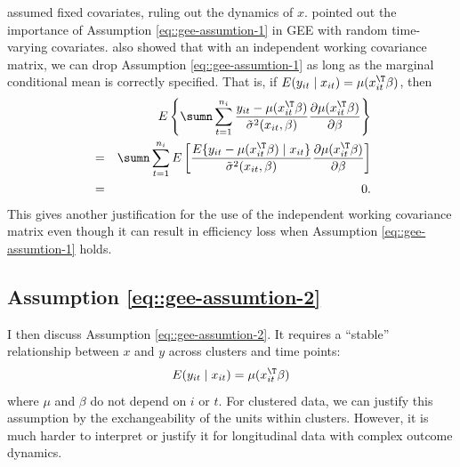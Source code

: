 \citet{liang1986longitudinal} assumed fixed covariates, ruling out the dynamics of $x$.
\citet{sullivan1994cautionary} pointed out the importance of Assumption \eqref{eq::gee-assumtion-1} in GEE with random time-varying covariates. \citet{sullivan1994cautionary}  also showed that with an independent working covariance matrix, we can drop Assumption \eqref{eq::gee-assumtion-1} as long as the marginal conditional mean is correctly specified. That is, if $E(y_{it}\mid x_{it}) = \mu(x_{it}^{\T}\beta)$, then 
\begin{eqnarray*}
&&E\left\{ \sumn\sum_{t=1}^{n_{i}}\frac{y_{it}-\mu(x_{it}^{\T}\beta)}{\tilde{\sigma}^{2}(x_{it}, \beta)}\frac{\partial\mu(x_{it}^{\T}\beta)}{\partial\beta} \right\}  \\
 &=&\sumn\sum_{t=1}^{n_{i}}  E\left[ \frac{ E\{ y_{it}-\mu(x_{it}^{\T}\beta) \mid x_{it} \} }{\tilde{\sigma}^{2}(x_{it}, \beta)}\frac{\partial\mu(x_{it}^{\T}\beta)}{\partial\beta} \right] \\
 &=& 0.
\end{eqnarray*}
This gives another justification for the use of the independent working covariance matrix even though it can result in efficiency loss when Assumption \eqref{eq::gee-assumtion-1} holds. 


\subsection{Assumption \eqref{eq::gee-assumtion-2}} 

I then discuss Assumption \eqref{eq::gee-assumtion-2}. It requires a ``stable'' relationship between $x$ and $y$ across clusters and time points:
$$
E(y_{it} \mid x_{it}) = \mu(x_{it}^{\T} \beta)
$$ 
where $\mu$ and $\beta$ do not depend on $i$ or $t$. 
For clustered data, we can justify this assumption by the exchangeability of the units within clusters. However, it is much harder to interpret or justify it for longitudinal data with complex outcome dynamics. 

